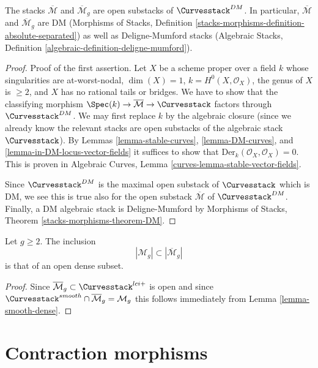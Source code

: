 \begin{lemma}
\label{lemma-stable-curves-deligne-mumford}
The stacks $\overline{\mathcal{M}}$ and
$\overline{\mathcal{M}}_g$
are open substacks of $\Curvesstack^{DM}$.
In particular, $\overline{\mathcal{M}}$ and
$\overline{\mathcal{M}}_g$ are DM
(Morphisms of Stacks, Definition
\ref{stacks-morphisms-definition-absolute-separated})
as well as Deligne-Mumford stacks
(Algebraic Stacks, Definition \ref{algebraic-definition-deligne-mumford}).
\end{lemma}

\begin{proof}
Proof of the first assertion.
Let $X$ be a scheme proper over a field $k$ whose singularities
are at-worst-nodal, $\dim(X) = 1$, $k = H^0(X, \mathcal{O}_X)$,
the genus of $X$ is $\geq 2$, and $X$ has no rational tails or bridges.
We have to show that the classifying morphism
$\Spec(k) \to \overline{\mathcal{M}} \to \Curvesstack$
factors through $\Curvesstack^{DM}$.
We may first replace $k$ by the algebraic closure
(since we already know the relevant stacks are open
substacks of the algebraic stack $\Curvesstack$).
By Lemmas \ref{lemma-stable-curves}, \ref{lemma-DM-curves}, and
\ref{lemma-in-DM-locus-vector-fields} it suffices to show that
$\text{Der}_k(\mathcal{O}_X, \mathcal{O}_X) = 0$.
This is proven in
Algebraic Curves, Lemma \ref{curves-lemma-stable-vector-fields}.

\medskip\noindent
Since $\Curvesstack^{DM}$ is the maximal open substack of
$\Curvesstack$ which is DM, we see this is true also for the
open substack $\overline{\mathcal{M}}$ of $\Curvesstack^{DM}$.
Finally, a DM algebraic stack is Deligne-Mumford by
Morphisms of Stacks, Theorem \ref{stacks-morphisms-theorem-DM}.
\end{proof}

\begin{lemma}
\label{lemma-smooth-dense-in-stable}
Let $g \geq 2$. The inclusion
$$
|\mathcal{M}_g| \subset |\overline{\mathcal{M}}_g|
$$
is that of an open dense subset.
\end{lemma}

\begin{proof}
Since $\overline{\mathcal{M}}_g \subset \Curvesstack^{lci+}$
is open and since
$\Curvesstack^{smooth} \cap \overline{\mathcal{M}}_g = \mathcal{M}_g$
this follows immediately from
Lemma \ref{lemma-smooth-dense}.
\end{proof}




\section{Contraction morphisms}
\label{section-contracting}

